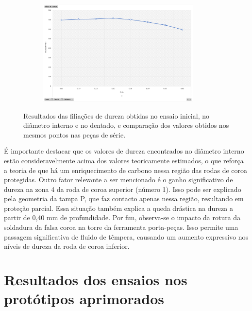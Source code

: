 \begin{figure}[htb]
\begin{subfigure}{.4\textwidth}
        \caption[]%
        {}
        \label{fig:resultados_Tampa_P_inicial_dent}
    \end{subfigure}%
    \begin{subfigure}{.4\textwidth}
        \centering
        \includegraphics[width = 0.9\textwidth]{Figures/Cap4/Grafico_4_Zonas_S_inicial_dentado.png}
        \caption{}
        \label{fig:resultados_Serie_inicial_dent}
    \end{subfigure}
    \caption[Resultados do ensaio inicial e comparação com peças de série]%
    {Resultados das filiações de dureza obtidas no ensaio inicial, no diâmetro interno e no dentado, e comparação dos valores obtidos nos mesmos pontos nas peças de série.}
\end{figure}
\newpage
\par
É importante destacar que os valores de dureza encontrados no diâmetro interno estão consideravelmente acima dos valores teoricamente estimados, o que reforça a teoria de que há um enriquecimento de carbono nessa região das rodas de coroa protegidas. Outro fator relevante a ser mencionado é o ganho significativo de dureza na zona 4 da roda de coroa superior (número 1). Isso pode ser explicado pela geometria da tampa P, que faz contacto apenas nessa região, resultando em proteção parcial. Essa situação também explica a queda drástica na dureza a partir de 0,40 mm de profundidade. Por fim, observa-se o impacto da rotura da soldadura da falsa coroa na torre da ferramenta porta-peças. Isso permite uma passagem significativa de fluido de têmpera, causando um aumento expressivo nos níveis de dureza da roda de coroa inferior.
\section{Resultados dos ensaios nos protótipos aprimorados} \label{sec:resultados_ensaios}

